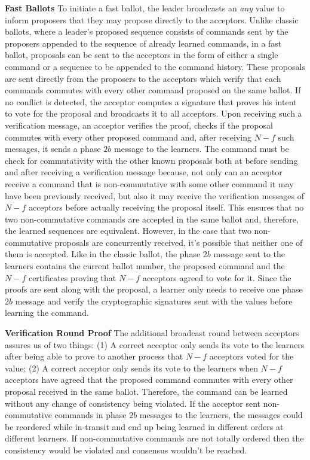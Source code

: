 \textbf{Fast Ballots} To initiate a fast ballot, the leader broadcasts an \textit{any} value to inform proposers that they may propose directly to the acceptors. Unlike classic ballots, where a leader's proposed sequence consists of commands sent by the proposers appended to the sequence of already learned commands, in a fast ballot, proposals can be sent to the acceptors in the form of either a single command or a sequence to be appended to the command history. These proposals are sent directly from the proposers to the acceptors which verify that each commands commutes with every other command proposed on the same ballot. If no conflict is detected, the acceptor computes a signature that proves his intent to vote for the proposal and broadcasts it to all acceptors. Upon receiving such a verification message, an acceptor verifies the proof, checks if the proposal commutes with every other proposed command and, after receiving $N-f$ such messages, it sends a phase $2b$ message to the learners. The command must be check for commutativity with the other known proposals both at before sending and after receiving a verification message because, not only can an acceptor receive a command that is non-commutative with some other command it may have been previously received, but also it may receive the verification messages of $N-f$ acceptors before actually receiving the proposal itself. This ensures that no two non-commutative commands are accepted in the same ballot and, therefore, the learned sequences are equivalent. However, in the case that two non-commutative proposals are concurrently received, it's possible that neither one of them is accepted. Like in the classic ballot, the phase $2b$ message sent to the learners contains the current ballot number, the proposed command and the $N-f$ certificates proving that $N-f$ acceptors agreed to vote for it. Since the proofs are sent along with the proposal, a learner only needs to receive one phase $2b$ message and verify the cryptographic signatures sent with the values before learning the command.\par
\textbf{Verification Round Proof} 
The additional broadcast round between acceptors assures us of two things: (1) A correct acceptor only sends its vote to the learners after being able to prove to another process that $N-f$ acceptors voted for the value; (2) A correct acceptor only sends its vote to the learners when $N-f$ acceptors have agreed that the proposed command commutes with every other proposal received in the same ballot. Therefore, the command can be learned without any change of consistency being violated. If the acceptor sent non-commutative commands in phase $2b$ messages to the learners, the messages could be reordered while in-transit and end up being learned in different orders at different learners. If non-commutative commands are not totally ordered then the consistency would be violated and consensus wouldn't be reached. \par
